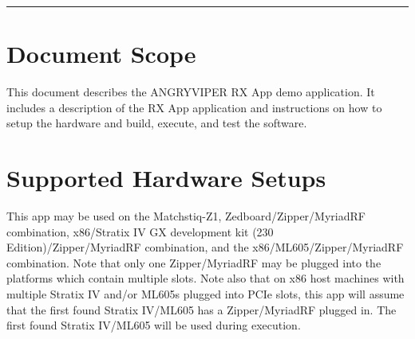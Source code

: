 \documentclass{article}
\begin{document}
\tableofcontents
\vspace{1pc}
\hrule
\section{Document Scope}
\noindent This document describes the ANGRYVIPER RX App demo application. It includes a description of the RX App application and instructions on how to setup the hardware and build, execute, and test the software.

\section{Supported Hardware Setups}
\noindent This app may be used on the Matchstiq-Z1, Zedboard/Zipper/MyriadRF combination, x86/Stratix IV GX development kit (230 Edition)/Zipper/MyriadRF combination, and the x86/ML605/Zipper/MyriadRF combination. Note that only one Zipper/MyriadRF may be plugged into the platforms which contain multiple slots. Note also that on x86 host machines with multiple Stratix IV and/or ML605s plugged into PCIe slots, this app will assume that the first found Stratix IV/ML605 has a Zipper/MyriadRF plugged in. The first found Stratix IV/ML605 will be used during execution.
\end{document}

